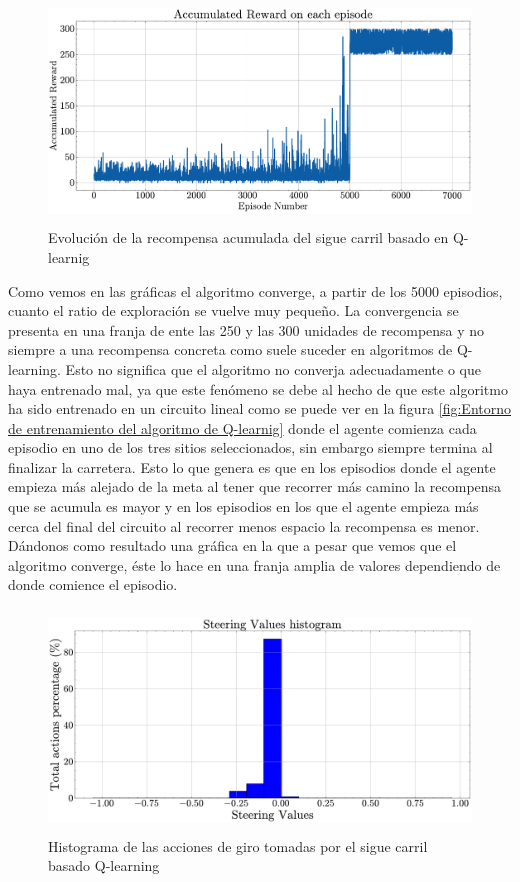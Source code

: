   \begin{figure}[h]
    \centering
    \includegraphics[height=6cm]{imagenes/cap4/sigue_carriles_qlearning/recompense.pdf}
    \caption{Evolución de la recompensa acumulada del sigue carril basado en Q-learnig}
    \label{fig:Evolución de la recompensa acumulada del algoritmo del sigue carriles basado en Qlearnig}
\end{figure}
Como vemos en las gráficas el algoritmo converge, a partir de los 5000 episodios, cuanto el ratio de exploración se vuelve muy pequeño. La convergencia se presenta en una franja de ente las 250 y las 300 unidades de recompensa y no siempre a una recompensa concreta como suele suceder en algoritmos de Q-learning. Esto no significa que el algoritmo no converja adecuadamente o que haya entrenado mal, ya que este fenómeno se debe al hecho de que este algoritmo ha sido entrenado en un circuito lineal como se puede ver en la figura \ref{fig:Entorno de entrenamiento del algoritmo de Q-learnig} donde el agente comienza cada episodio en uno de los tres sitios seleccionados, sin embargo siempre termina al finalizar la carretera. Esto lo que genera es que en los episodios donde el agente empieza más alejado de la meta al tener que recorrer más camino la recompensa que se acumula es mayor y en los episodios en los que el agente empieza más cerca del final del circuito al recorrer menos espacio la recompensa es menor. Dándonos como resultado una gráfica en la que a pesar que vemos que el algoritmo converge, éste lo hace en una franja amplia de valores dependiendo de donde comience el episodio.


  \begin{figure}[H]
    \centering
    \includegraphics[height=5.9cm]{imagenes/cap4/sigue_carriles_qlearning/actions.pdf}
    \caption{Histograma de las acciones de giro tomadas por el sigue carril basado Q-learning}
    \label{fig:Histograma de las acciones de giro tomadas por el agente de Qlearning tras el entrenamiento}
\end{figure}


